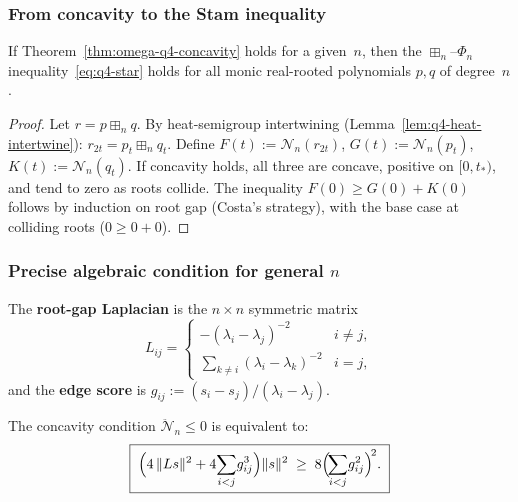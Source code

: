 \subsubsection{From concavity to the Stam inequality}

\begin{theorem}\label{thm:omega-q4-concavity-implies}
If Theorem~\ref{thm:omega-q4-concavity} holds for a given~$n$,
then the $\boxplus_n$--$\Phi_n$ inequality~\eqref{eq:q4-star} holds
for all monic real-rooted polynomials $p,q$ of degree~$n$.
\end{theorem}

\begin{proof}
Let $r=p\boxplus_n q$. By heat-semigroup intertwining
(Lemma~\ref{lem:q4-heat-intertwine}):
$r_{2t} = p_t \boxplus_n q_t$.
Define $F(t):=\mathcal N_n(r_{2t})$, $G(t):=\mathcal N_n(p_t)$,
$K(t):=\mathcal N_n(q_t)$.
If concavity holds, all three are concave, positive on $[0,t_*)$,
and tend to zero as roots collide.
The inequality $F(0)\ge G(0)+K(0)$ follows by induction on root gap
(Costa's strategy), with the base case at colliding roots ($0\ge 0+0$).
\end{proof}


\subsubsection{Precise algebraic condition for general $n$}%
\label{ss:omega-q4-condition-detail}

\begin{definition}
The \textbf{root-gap Laplacian} is the $n\times n$ symmetric matrix
\[
L_{ij} = \begin{cases}
-(\lambda_i-\lambda_j)^{-2} & i\ne j,\\[2pt]
\displaystyle\sum_{k\ne i}(\lambda_i-\lambda_k)^{-2} & i=j,
\end{cases}
\]
and the \textbf{edge score} is
$g_{ij}:=(s_i-s_j)/(\lambda_i-\lambda_j)$.
\end{definition}

\begin{proposition}\label{prop:omega-q4-ddot}
The concavity condition $\ddot{\mathcal N}_n\le 0$ is equivalent to:
\begin{equation}\label{eq:omega-q4-concavity-condition}
\boxed{\;
\Bigl(4\,\|Ls\|^2 + 4\!\sum_{i<j}\!g_{ij}^3\Bigr)\|s\|^2
\;\ge\;
8\Bigl(\!\sum_{i<j}\!g_{ij}^2\Bigr)^{\!2}.
\;}
\end{equation}
\end{proposition}

